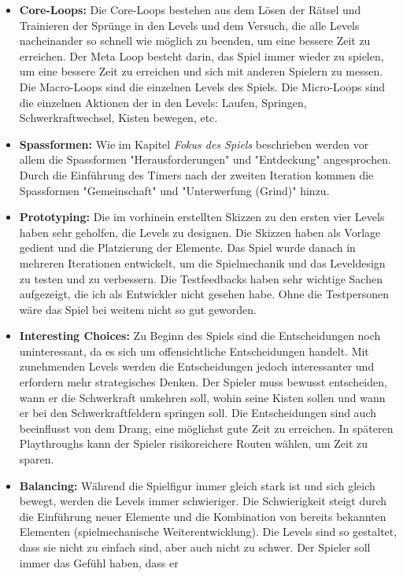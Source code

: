 \documentclass{article}
\begin{document}
\begin{itemize}
    \item \textbf{Core-Loops:} Die Core-Loops bestehen aus dem Lösen der Rätsel und Trainieren der Sprünge in den Levels und dem Versuch, die alle Levels nacheinander so schnell wie möglich zu beenden, um eine bessere Zeit zu erreichen.
    Der Meta Loop besteht darin, das Spiel immer wieder zu spielen, um eine bessere Zeit zu erreichen und sich mit anderen Spielern zu messen.
    Die Macro-Loops sind die einzelnen Levels des Spiels.
    Die Micro-Loops sind die einzelnen Aktionen der in den Levels: Laufen, Springen, Schwerkraftwechsel, Kisten bewegen, etc.
    \item \textbf{Spassformen:} Wie im Kapitel \textit{Fokus des Spiels} beschrieben werden vor allem die Spassformen "Herausforderungen" und "Entdeckung" angesprochen. 
    Durch die Einführung des Timers nach der zweiten Iteration kommen die Spassformen "Gemeinschaft" und "Unterwerfung (Grind)" hinzu.
    \item \textbf{Prototyping:} Die im vorhinein erstellten Skizzen zu den ersten vier Levels haben sehr geholfen, die Levels zu designen. Die Skizzen haben als Vorlage gedient und die Platzierung der Elemente.  
    Das Spiel wurde danach in mehreren Iterationen entwickelt, um die Spielmechanik und das Leveldesign zu testen und zu verbessern.
    Die Testfeedbacks haben sehr wichtige Sachen aufgezeigt, die ich als Entwickler nicht gesehen habe. Ohne die Testpersonen wäre das Spiel bei weitem nicht so gut geworden.
    \item \textbf{Interesting Choices:} Zu Beginn des Spiels sind die Entscheidungen noch uninteressant, da es sich um offensichtliche Entscheidungen handelt.
    Mit zunehmenden Levels werden die Entscheidungen jedoch interessanter und erfordern mehr strategisches Denken. Der Spieler muss bewusst entscheiden, wann er die Schwerkraft umkehren
    soll, wohin seine Kisten sollen und wann er bei den Schwerkraftfeldern springen soll. Die Entscheidungen sind auch beeinflusst von dem Drang, eine möglichst gute Zeit zu erreichen.
    In späteren Playthroughs kann der Spieler risikoreichere Routen wählen, um Zeit zu sparen.
    \item \textbf{Balancing:} Während die Spielfigur immer gleich stark ist und sich gleich bewegt, werden die Levels immer schwieriger. Die Schwierigkeit steigt durch die Einführung neuer Elemente
    und die Kombination von bereits bekannten Elementen (spielmechanische Weiterentwicklung). Die Levels sind so gestaltet, dass sie nicht zu einfach sind, aber auch nicht zu schwer. Der Spieler soll immer das Gefühl haben, dass er

\end{itemize}
\end{document}
